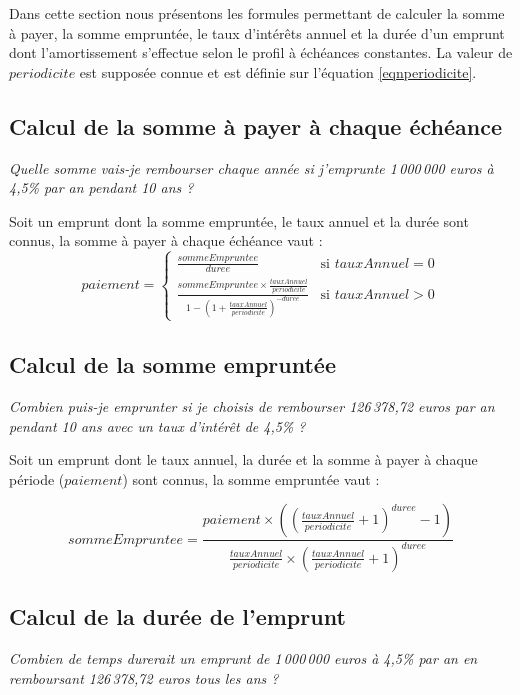 \documentclass[11pt,a4paper]{scrartcl}
\begin{document}
Dans cette section nous présentons les formules permettant de calculer la somme à payer, la somme empruntée, le taux d'intérêts annuel et la durée d'un emprunt dont l'amortissement s'effectue selon le profil à échéances constantes. La valeur de $periodicite$ est supposée connue et est définie sur l'équation \ref{eqnperiodicite}.


\subsection{Calcul de la somme à payer à chaque échéance}
\emph{Quelle somme vais-je rembourser chaque année si j'emprunte 1\,000\,000 euros à 4,5\% par an pendant 10 ans ?}


Soit un emprunt dont la somme empruntée, le taux annuel et la durée sont connus, la somme à payer à chaque échéance vaut :
\begin{equation}
	paiement=\begin{cases}
	\frac{sommeEmpruntee}{duree} & \text{si } tauxAnnuel = 0 \\
	\frac{sommeEmpruntee \times \frac{tauxAnnuel}{periodicite}}{1-(1+\frac{tauxAnnuel}{periodicite})^{-duree}} & \text{si } tauxAnnuel > 0
	\end{cases}
\end{equation}
		

\subsection{Calcul de la somme empruntée}
\emph{Combien puis-je emprunter si je choisis de rembourser 126\,378,72 euros par an pendant 10 ans avec un taux d'intérêt de 4,5\% ?}

Soit un emprunt dont le taux annuel, la durée et la somme à payer à chaque période ($paiement$) sont connus, la somme empruntée vaut :

		\begin{equation}
			sommeEmpruntee=\frac{paiement \times ((\frac{tauxAnnuel}{periodicite}+1)^{duree}-1)}{\frac{tauxAnnuel}{periodicite} \times (\frac{tauxAnnuel}{periodicite}+1)^{duree}}
		\end{equation}

\subsection{Calcul de la durée de l'emprunt}
\emph{Combien de temps durerait un emprunt de 1\,000\,000 euros à 4,5\% par an en remboursant 126\,378,72 euros tous les ans ?}
\end{document}
